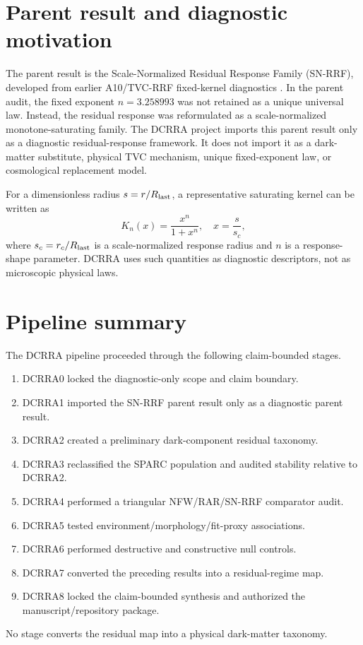 \documentclass[11pt,a4paper]{article}
\begin{document}
\section{Parent result and diagnostic motivation}
The parent result is the Scale-Normalized Residual Response Family (SN-RRF), developed from earlier A10/TVC-RRF fixed-kernel diagnostics \cite{yoshimura2026snrrf}. In the parent audit, the fixed exponent $n=3.258993$ was not retained as a unique universal law. Instead, the residual response was reformulated as a scale-normalized monotone-saturating family. The DCRRA project imports this parent result only as a diagnostic residual-response framework. It does not import it as a dark-matter substitute, physical TVC mechanism, unique fixed-exponent law, or cosmological replacement model.

For a dimensionless radius $s = r/R_{\rm last}$, a representative saturating kernel can be written as
\begin{equation}
K_n(x) = \frac{x^n}{1+x^n},\quad x = \frac{s}{s_c},
\end{equation}
where $s_c=r_c/R_{\rm last}$ is a scale-normalized response radius and $n$ is a response-shape parameter. DCRRA uses such quantities as diagnostic descriptors, not as microscopic physical laws.

\section{Pipeline summary}
The DCRRA pipeline proceeded through the following claim-bounded stages.
\begin{enumerate}
\item DCRRA0 locked the diagnostic-only scope and claim boundary.
\item DCRRA1 imported the SN-RRF parent result only as a diagnostic parent result.
\item DCRRA2 created a preliminary dark-component residual taxonomy.
\item DCRRA3 reclassified the SPARC population and audited stability relative to DCRRA2.
\item DCRRA4 performed a triangular NFW/RAR/SN-RRF comparator audit.
\item DCRRA5 tested environment/morphology/fit-proxy associations.
\item DCRRA6 performed destructive and constructive null controls.
\item DCRRA7 converted the preceding results into a residual-regime map.
\item DCRRA8 locked the claim-bounded synthesis and authorized the manuscript/repository package.
\end{enumerate}
No stage converts the residual map into a physical dark-matter taxonomy.
\end{document}
